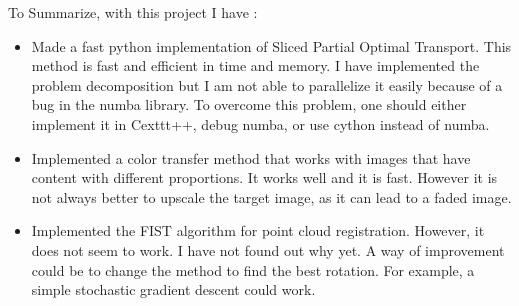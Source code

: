 \documentclass[a4paper,12pt]{article}
\begin{document}
\bigskip


To Summarize, with this project I have :
\begin{itemize}
\item Made a fast python implementation of Sliced Partial Optimal Transport. This method is fast and efficient in time and memory. I have implemented the problem decomposition but I am not able to parallelize it easily because of a bug in the numba library. To overcome this problem, one should either implement it in Cexttt{++}, debug numba, or use cython instead of numba.
\item Implemented a color transfer method that works with images that have content with different proportions. It works well and it is fast. However it is not always better to upscale the target image, as it can lead to a faded image.
\item Implemented the FIST algorithm for point cloud registration. However, it does not seem to work. I have not found out why yet. A way of improvement could be to change the method to find the best rotation. For example, a simple stochastic gradient descent could work.
\end{itemize}






\end{document}
